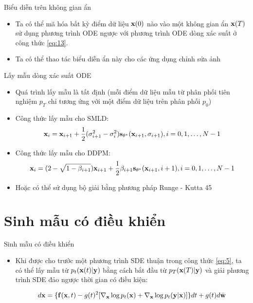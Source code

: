 \documentclass[10pt]{beamer}
\theoremstyle{remark}
\numberwithin{algocf}{section}
\numberwithin{equation}{section}
\numberwithin{dl}{section}
\numberwithin{figure}{section}
\begin{document}
\begin{frame}{Biểu diễn trên không gian ẩn}
	\begin{itemize}
		\item Ta có thể mã hóa bất kỳ điểm dữ liệu $\bold{x}(0)$ nào vào một không gian ẩn $\bold{x}(T)$ sử dụng phương trình ODE ngược với phương trình ODE dòng xác suất ở công thức \ref{eq:13}.
		\item Ta có thể thao tác biểu diễn ẩn này cho các ứng dụng chỉnh sửa ảnh
	\end{itemize}
\end{frame}

\begin{frame}{Lấy mẫu dòng xác suất ODE}
	\begin{itemize}
		\item Quá trình lấy mẫu là tất định (mỗi điểm dữ liệu mẫu từ phân phối tiên nghiệm $p_T$ chỉ tương ứng với một điểm dữ liệu trên phân phối $p_0$)
		\item Công thức lấy mẫu cho SMLD:
		\begin{equation} \label{eq:43}
			\bold{x}_i = \bold{x}_{i+1} + \dfrac{1}{2} (\sigma_{i+1}^2 - \sigma_i^2) \bold{s}_{\bold{\theta}^{\ast}} (\bold{x}_{i+1}, \sigma_{i+1}), i = 0, 1, \dots, N - 1
		\end{equation}
		\item Công thức lấy mẫu cho DDPM:
		\begin{equation} \label{eq:44}
			\bold{x}_i = (2 - \sqrt{1 - \beta_{i+1}}) \bold{x}_{i+1} + \dfrac{1}{2} \beta_{i+1} \bold{s}_{\bold{\theta}^{\ast}} (\bold{x}_{i+1}, i + 1), i = 0, 1, \dots, N - 1
		\end{equation}
		\item Hoặc có thể sử dụng bộ giải bằng phương pháp Runge - Kutta 45
	\end{itemize}
\end{frame}

\section{Sinh mẫu có điều khiển}

\begin{frame}{Sinh mẫu có điều khiển}
	\begin{itemize}
		\item Khi được cho trước một phương trình SDE thuận trong công thức \ref{eq:5}, ta có thể lấy mẫu từ $p_t(\bold{x}(t) \vert \bold{y})$ bằng cách bắt đầu từ $p_T (\bold{x}(T) \vert \bold{y})$ và giải phương trình SDE đảo ngược thời gian có điều kiện:

		\begin{equation} \label{eq:14}
			d \bold{x} = \lbrace \bold{f}(\bold{x}, t) - g (t)^2 \lbrack \nabla_{\bold{x}} \log p_t(\bold{x}) + \nabla_{\bold{x}} \log p_t (\bold{y} \vert \bold{x}) \rbrack \rbrace dt + g(t) d \bar{\bold{w}}
		\end{equation}
	\end{itemize}
\end{frame}
\end{document}
